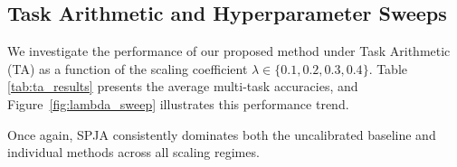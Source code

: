 \documentclass{article}
\theoremstyle{plain}
\theoremstyle{definition}
\theoremstyle{remark}
\begin{document}
\subsection{Task Arithmetic and Hyperparameter Sweeps}
We investigate the performance of our proposed method under Task Arithmetic (TA) as a function of the scaling coefficient $\lambda \in \{0.1, 0.2, 0.3, 0.4\}$. Table \ref{tab:ta_results} presents the average multi-task accuracies, and Figure~\ref{fig:lambda_sweep} illustrates this performance trend.
\begin{table}[h]
\caption{Multi-task model merging average accuracies (\%) under Task Arithmetic (TA) across varying scaling coefficients $\lambda$ on ResNet-18.}
\label{tab:ta_results}
\begin{center}
\begin{small}
\begin{sc}
\end{sc}
\end{small}
\end{center}
\vskip -0.1in
\end{table}
 Once again, SPJA consistently dominates both the uncalibrated baseline and individual methods across all scaling regimes.
\end{document}
